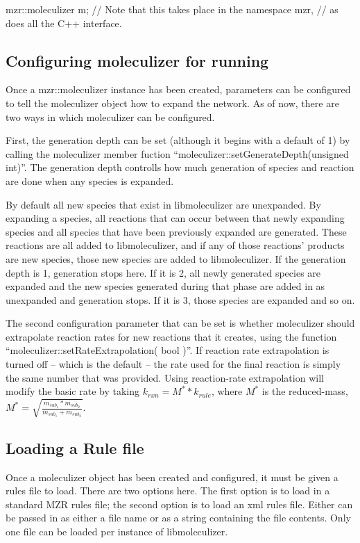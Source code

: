 \begin{ExampleCPP}[caption=Creating a moleculizer object, label=creatingmzrexample]
mzr::moleculizer m; // Note that this takes place in the namespace mzr,
                    // as does all the C++ interface.
\end{ExampleCPP}


\subsection{Configuring moleculizer for running}
Once a mzr::moleculizer instance has been created, parameters can be
configured to tell the moleculizer object how to expand the network.
As of now, there are two ways in which moleculizer can be configured.  

First, the generation depth can be set (although it begins with a
default of 1) by calling the moleculizer member fuction
``moleculizer::setGenerateDepth(unsigned int)''.  The generation depth
controlls how much generation of species and reaction are done when
any species is expanded.  

By default all new species that exist in libmoleculizer are
unexpanded.  By expanding a species, all reactions that can occur
between that newly expanding species and all species that have been
previously expanded are generated.  These reactions are all added to
libmoleculizer, and if any of those reactions' products are new
species, those new species are added to libmoleculizer.  If the
generation depth is 1, generation stops here.  If it is 2, all newly
generated species are expanded and the new species generated during
that phase are added in as unexpanded and generation stops.  If it is
3, those species are expanded and so on.  

The second configuration parameter that can be set is whether
moleculizer should extrapolate reaction rates for new reactions that
it creates, using the function ``moleculizer::setRateExtrapolation(
bool )''.  If reaction rate extrapolation is turned off -- which is the default
-- the rate used for the final reaction is simply the same number that
was provided.  Using reaction-rate extrapolation will modify the basic
rate by taking $k_{rxn} = M^*
* k_{rule}$, where $M^*$ is the reduced-mass,
$M^*=\sqrt{\frac{m_{sub_1} * m_{sub_2}}{m_{sub_1} + m_{sub_2}} }$.

\subsection{Loading a Rule file}
Once a moleculizer object has been created and configured, it must be
given a rules file to load.  There are two options here.  The first
option is to load in a standard MZR rules file; the second option is
to load an xml rules file.  Either can be passed in as either a file
name or as a string containing the file contents.  Only one file can
be loaded per instance of libmoleculizer.

